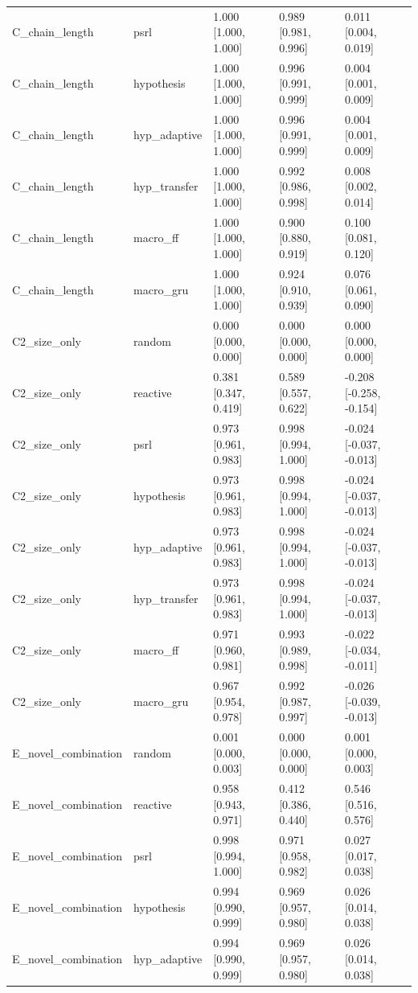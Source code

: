 \begin{tabular}{lllll}
C\_chain\_length & psrl & 1.000 [1.000, 1.000] & 0.989 [0.981, 0.996] & 0.011 [0.004, 0.019] \\
C\_chain\_length & hypothesis & 1.000 [1.000, 1.000] & 0.996 [0.991, 0.999] & 0.004 [0.001, 0.009] \\
C\_chain\_length & hyp\_adaptive & 1.000 [1.000, 1.000] & 0.996 [0.991, 0.999] & 0.004 [0.001, 0.009] \\
C\_chain\_length & hyp\_transfer & 1.000 [1.000, 1.000] & 0.992 [0.986, 0.998] & 0.008 [0.002, 0.014] \\
C\_chain\_length & macro\_ff & 1.000 [1.000, 1.000] & 0.900 [0.880, 0.919] & 0.100 [0.081, 0.120] \\
C\_chain\_length & macro\_gru & 1.000 [1.000, 1.000] & 0.924 [0.910, 0.939] & 0.076 [0.061, 0.090] \\
C2\_size\_only & random & 0.000 [0.000, 0.000] & 0.000 [0.000, 0.000] & 0.000 [0.000, 0.000] \\
C2\_size\_only & reactive & 0.381 [0.347, 0.419] & 0.589 [0.557, 0.622] & -0.208 [-0.258, -0.154] \\
C2\_size\_only & psrl & 0.973 [0.961, 0.983] & 0.998 [0.994, 1.000] & -0.024 [-0.037, -0.013] \\
C2\_size\_only & hypothesis & 0.973 [0.961, 0.983] & 0.998 [0.994, 1.000] & -0.024 [-0.037, -0.013] \\
C2\_size\_only & hyp\_adaptive & 0.973 [0.961, 0.983] & 0.998 [0.994, 1.000] & -0.024 [-0.037, -0.013] \\
C2\_size\_only & hyp\_transfer & 0.973 [0.961, 0.983] & 0.998 [0.994, 1.000] & -0.024 [-0.037, -0.013] \\
C2\_size\_only & macro\_ff & 0.971 [0.960, 0.981] & 0.993 [0.989, 0.998] & -0.022 [-0.034, -0.011] \\
C2\_size\_only & macro\_gru & 0.967 [0.954, 0.978] & 0.992 [0.987, 0.997] & -0.026 [-0.039, -0.013] \\
E\_novel\_combination & random & 0.001 [0.000, 0.003] & 0.000 [0.000, 0.000] & 0.001 [0.000, 0.003] \\
E\_novel\_combination & reactive & 0.958 [0.943, 0.971] & 0.412 [0.386, 0.440] & 0.546 [0.516, 0.576] \\
E\_novel\_combination & psrl & 0.998 [0.994, 1.000] & 0.971 [0.958, 0.982] & 0.027 [0.017, 0.038] \\
E\_novel\_combination & hypothesis & 0.994 [0.990, 0.999] & 0.969 [0.957, 0.980] & 0.026 [0.014, 0.038] \\
E\_novel\_combination & hyp\_adaptive & 0.994 [0.990, 0.999] & 0.969 [0.957, 0.980] & 0.026 [0.014, 0.038] \\

\end{tabular}
